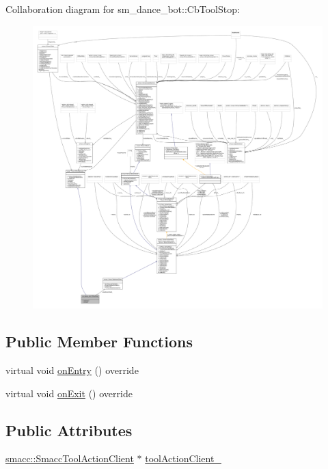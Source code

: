 Collaboration diagram for sm\+\_\+dance\+\_\+bot\+:\+:Cb\+Tool\+Stop\+:
\nopagebreak
\begin{figure}[H]
\begin{center}
\leavevmode
\includegraphics[width=350pt]{classsm__dance__bot_1_1CbToolStop__coll__graph}
\end{center}
\end{figure}
\subsection*{Public Member Functions}
\begin{DoxyCompactItemize}
\item 
virtual void \hyperlink{classsm__dance__bot_1_1CbToolStop_a453bebcefc3f8217bfe37f85a29ecf25}{on\+Entry} () override
\item 
virtual void \hyperlink{classsm__dance__bot_1_1CbToolStop_a84f13b3392558cdabd7a141445b0fa02}{on\+Exit} () override
\end{DoxyCompactItemize}
\subsection*{Public Attributes}
\begin{DoxyCompactItemize}
\item 
\hyperlink{classsmacc_1_1SmaccToolActionClient}{smacc\+::\+Smacc\+Tool\+Action\+Client} $\ast$ \hyperlink{classsm__dance__bot_1_1CbToolStop_aa8d9400ae702c970f970980e5d7a13c5}{tool\+Action\+Client\+\_\+}
\end{DoxyCompactItemize}


